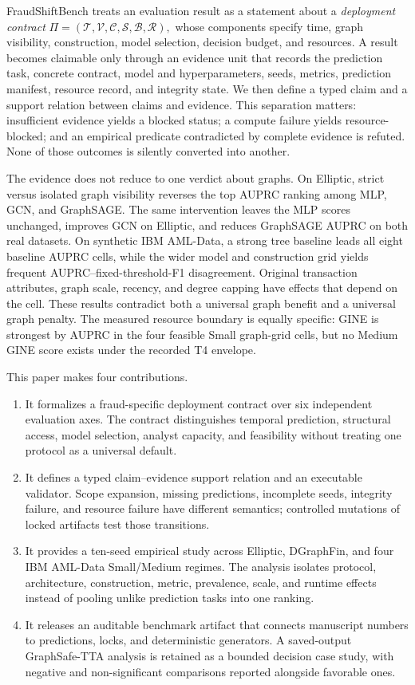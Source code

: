 FraudShiftBench treats an evaluation result as a statement about a \emph{deployment contract}
\(
\Pi=(\mathcal{T},\mathcal{V},\mathcal{C},\mathcal{S},\mathcal{B},\mathcal{R}),
\)
whose components specify time, graph visibility, construction, model selection, decision budget, and resources. A result becomes claimable only through an evidence unit that records the prediction task, concrete contract, model and hyperparameters, seeds, metrics, prediction manifest, resource record, and integrity state. We then define a typed claim and a support relation between claims and evidence. This separation matters: insufficient evidence yields a blocked status; a compute failure yields resource-blocked; and an empirical predicate contradicted by complete evidence is refuted. None of those outcomes is silently converted into another.

The evidence does not reduce to one verdict about graphs. On Elliptic, strict versus isolated graph visibility reverses the top AUPRC ranking among MLP, GCN, and GraphSAGE. The same intervention leaves the MLP scores unchanged, improves GCN on Elliptic, and reduces GraphSAGE AUPRC on both real datasets. On synthetic IBM AML-Data, a strong tree baseline leads all eight baseline AUPRC cells, while the wider model and construction grid yields frequent AUPRC--fixed-threshold-F1 disagreement. Original transaction attributes, graph scale, recency, and degree capping have effects that depend on the cell. These results contradict both a universal graph benefit and a universal graph penalty. The measured resource boundary is equally specific: GINE is strongest by AUPRC in the four feasible Small graph-grid cells, but no Medium GINE score exists under the recorded T4 envelope.

This paper makes four contributions.
\begin{enumerate}
    \item It formalizes a fraud-specific deployment contract over six independent evaluation axes. The contract distinguishes temporal prediction, structural access, model selection, analyst capacity, and feasibility without treating one protocol as a universal default.
    \item It defines a typed claim--evidence support relation and an executable validator. Scope expansion, missing predictions, incomplete seeds, integrity failure, and resource failure have different semantics; controlled mutations of locked artifacts test those transitions.
    \item It provides a ten-seed empirical study across Elliptic, DGraphFin, and four IBM AML-Data Small/Medium regimes. The analysis isolates protocol, architecture, construction, metric, prevalence, scale, and runtime effects instead of pooling unlike prediction tasks into one ranking.
    \item It releases an auditable benchmark artifact that connects manuscript numbers to predictions, locks, and deterministic generators. A saved-output GraphSafe-TTA analysis is retained as a bounded decision case study, with negative and non-significant comparisons reported alongside favorable ones.
\end{enumerate}

